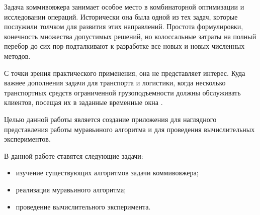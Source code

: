 \newpage
{}

Задача коммивояжера занимает особое место в комбинаторной оптимизации и исследовании операций.
Исторически она была одной из тех задач, которые послужили толчком для развития этих направлений.
Простота формулировки, конечность множества допустимых решений, но колоссальные затраты на полный
перебор до сих пор подталкивают к разработке все новых и новых численных методов.

С точки зрения практического применения, она не представляет интерес.
Куда важнее дополнения задачи для транспорта и логистики, когда несколько
транспортных средств ограниченной грузоподъемности должны обслуживать клиентов,
посещая их в заданные временные окна \cite{kommivoyadjer}.

Целью данной работы является создание приложения для наглядного представления работы муравьиного
алгоритма и для проведения вычислительных экспериментов.

В данной работе ставятся следующие задачи:

\begin{itemize}
    \item изучение существующих алгоритмов задачи коммивояжера;
    \item реализация муравьиного алгоритма;
    \item проведение вычислительного эксперимента.
\end{itemize}
